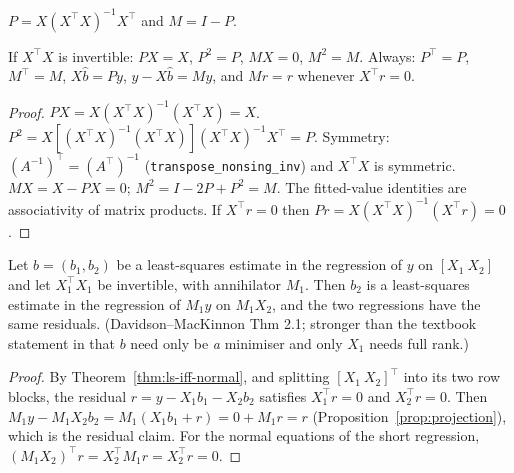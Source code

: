 \begin{definition}
\label{def:hat}
\leanok
$P = X (X^\top X)^{-1} X^\top$ and $M = I - P$.
\end{definition}

\begin{proposition}
\label{prop:projection}
\leanok
{}
If $X^\top X$ is invertible: $PX = X$, $P^2 = P$, $MX = 0$, $M^2 = M$. Always: $P^\top = P$, $M^\top = M$,
$X\hat b = Py$, $y - X\hat b = My$, and $Mr = r$ whenever $X^\top r = 0$.
\end{proposition}
\begin{proof}
\leanok
$PX = X(X^\top X)^{-1}(X^\top X) = X$. $P^2 = X[(X^\top X)^{-1}(X^\top X)](X^\top X)^{-1}X^\top = P$.
Symmetry: $(A^{-1})^\top = (A^\top)^{-1}$ (\texttt{transpose\_nonsing\_inv}) and $X^\top X$ is symmetric.
$MX = X - PX = 0$; $M^2 = I - 2P + P^2 = M$. The fitted-value identities are associativity of matrix
products. If $X^\top r = 0$ then $Pr = X(X^\top X)^{-1}(X^\top r) = 0$.
\end{proof}

\begin{theorem}
\label{thm:fwl}
\leanok
{}
Let $b = (b_1, b_2)$ be a least-squares estimate in the regression of $y$ on $[X_1\ X_2]$ and let $X_1^\top X_1$
be invertible, with annihilator $M_1$. Then $b_2$ is a least-squares estimate in the regression of $M_1 y$ on
$M_1 X_2$, and the two regressions have the same residuals. (Davidson--MacKinnon Thm 2.1; stronger than the
textbook statement in that $b$ need only be \emph{a} minimiser and only $X_1$ needs full rank.)
\end{theorem}
\begin{proof}
\leanok
{}
By Theorem~\ref{thm:ls-iff-normal}, and splitting $[X_1\ X_2]^\top$ into its two row blocks, the residual
$r = y - X_1 b_1 - X_2 b_2$ satisfies $X_1^\top r = 0$ and $X_2^\top r = 0$. Then
$M_1 y - M_1 X_2 b_2 = M_1(X_1 b_1 + r) = 0 + M_1 r = r$ (Proposition~\ref{prop:projection}), which is the
residual claim. For the normal equations of the short regression,
$(M_1X_2)^\top r = X_2^\top M_1 r = X_2^\top r = 0$.
\end{proof}


